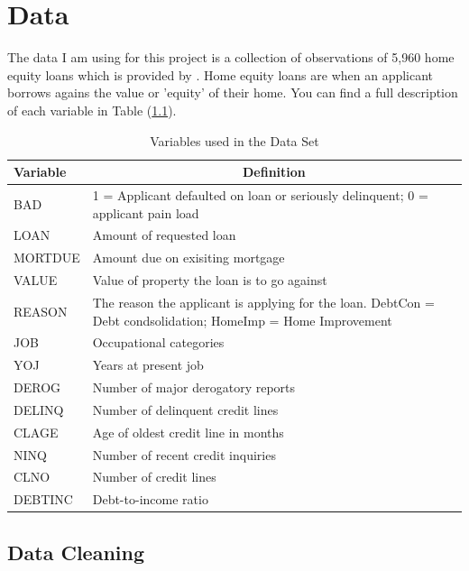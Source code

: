 \chapter{Data} \label{cha:chapter-2}

The data I am using for this project is a collection of observations of 5,960 home equity loans which is provided by \parencite{baesens2016credit}. Home equity loans are when an applicant borrows agains the value or 'equity' of their home. You can find a full description of each variable in Table (\ref{MetaData}).

\begin{table}[ht]\label{Table2}
	\centering
	\renewcommand{\arraystretch}{1.5}
	\begin{tabular}{l p{10cm}}
	\hline
	Variable & \multicolumn{1}{c}{Definition}\\ 
	\hline
	BAD & 1 = Applicant defaulted on loan or seriously delinquent; 0 = applicant pain load \\
	LOAN & Amount of requested loan \\
	MORTDUE & Amount due on exisiting mortgage \\
	VALUE & Value of property the loan is to go against \\
	REASON & The reason the applicant is applying for the loan. DebtCon = Debt condsolidation; HomeImp = Home Improvement \\
	JOB & Occupational categories \\
	YOJ & Years at present job \\
	DEROG & Number of major derogatory reports \\
	DELINQ & Number of delinquent credit lines \\
	CLAGE & Age of oldest credit line in months \\
	NINQ & Number of recent credit inquiries \\
	CLNO & Number of credit lines \\
	DEBTINC & Debt-to-income ratio \\
	\end{tabular}
	\caption{Variables used in the Data Set \label{MetaData}}
\end{table}

\section{Data Cleaning}

